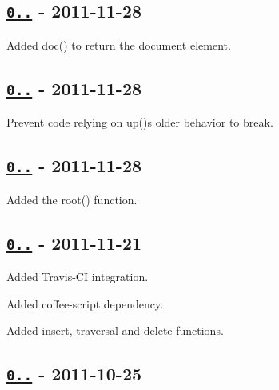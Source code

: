 \subsection*{\href{https://github.com/oozcitak/xmlbuilder-js/compare/v0.2.2...v0.3.0}{\tt 0..} -\/ 2011-\/11-\/28}


\begin{DoxyItemize}
\item Added {\ttfamily doc()} to return the document element.
\end{DoxyItemize}

\subsection*{\href{https://github.com/oozcitak/xmlbuilder-js/compare/v0.2.1...v0.2.2}{\tt 0..} -\/ 2011-\/11-\/28}


\begin{DoxyItemize}
\item Prevent code relying on {\ttfamily up()}\textquotesingle{}s older behavior to break.
\end{DoxyItemize}

\subsection*{\href{https://github.com/oozcitak/xmlbuilder-js/compare/v0.2.0...v0.2.1}{\tt 0..} -\/ 2011-\/11-\/28}


\begin{DoxyItemize}
\item Added the {\ttfamily root()} function.
\end{DoxyItemize}

\subsection*{\href{https://github.com/oozcitak/xmlbuilder-js/compare/v0.1.7...v0.2.0}{\tt 0..} -\/ 2011-\/11-\/21}


\begin{DoxyItemize}
\item Added Travis-\/\+CI integration.
\item Added coffee-\/script dependency.
\item Added insert, traversal and delete functions.
\end{DoxyItemize}

\subsection*{\href{https://github.com/oozcitak/xmlbuilder-js/compare/v0.1.6...v0.1.7}{\tt 0..} -\/ 2011-\/10-\/25}


